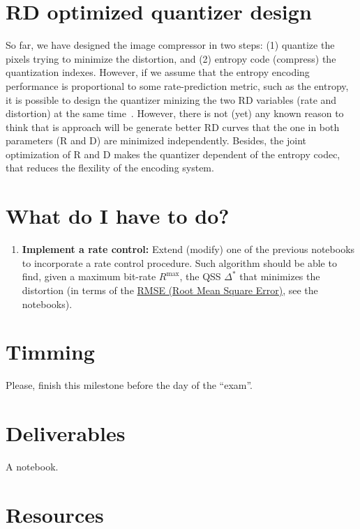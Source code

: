 {\section{RD optimized quantizer design}
So far, we have designed the image compressor in two steps: (1)
quantize the pixels trying to minimize the distortion, and (2) entropy
code (compress) the quantization indexes. However, if we assume that
the entropy encoding performance is proportional to some
rate-prediction metric, such as the entropy, it is possible to design
the quantizer minizing the two RD variables (rate and distortion) at
the same time~\cite{sayood2017introduction}. However, there is not
(yet) any known reason to think that is approach will be generate
better RD curves that the one in both parameters (R and D) are
minimized independently. Besides, the joint optimization of R and D
makes the quantizer dependent of the entropy codec, that reduces the
flexility of the encoding system.

\section{What do I have to do?}
\begin{enumerate}
\item \textbf{Implement a rate control:} Extend (modify) one of the
  previous notebooks to incorporate a rate control procedure. Such
  algorithm should be able to find, given a maximum bit-rate
  $R^\text{max}$, the QSS $\Delta^*$ that minimizes the distortion (in
  terms of the
  \href{https://en.wikipedia.org/wiki/Root-mean-square_deviation}{RMSE
    (Root Mean Square Error)}, see the notebooks).
\end{enumerate}

\section{Timming}
Please, finish this milestone before the day of the ``exam''.

\section{Deliverables}
A notebook.

\section{Resources}
\renewcommand{\addcontentsline}[3]{} %


}

